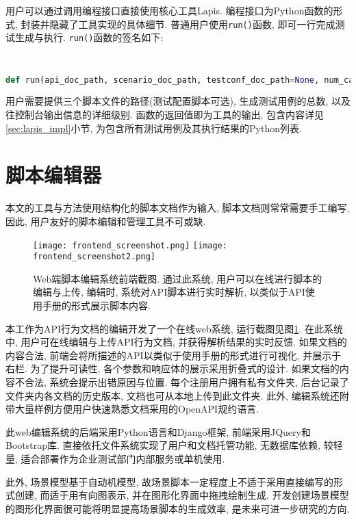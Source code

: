 	    \label{sec:program_interface}
        用户可以通过调用编程接口直接使用核心工具Lapis. 编程接口为Python函数的形式, 封装并隐藏了工具实现的具体细节. 普通用户使用\texttt{run()}函数, 即可一行完成测试生成与执行. \texttt{run()}函数的签名如下:
        \begin{flushleft}
            \scriptsize
            \tt
            \begin{lstlisting}[language=python]
def run(api_doc_path, scenario_doc_path, testconf_doc_path=None, num_case=1, verbose=0)
            \end{lstlisting}
        \end{flushleft}
        用户需要提供三个脚本文件的路径(测试配置脚本可选), 生成测试用例的总数, 以及往控制台输出信息的详细级别. 函数的返回值即为工具的输出, 包含内容详见\ref{sec:lapis_impl}小节, 为包含所有测试用例及其执行结果的Python列表.

	\section{脚本编辑器}

        本文的工具与方法使用结构化的脚本文档作为输入, 脚本文档则常常需要手工编写, 因此, 用户友好的脚本编辑和管理工具不可或缺.
        
        \begin{figure}[!htb]
            \centering
            \texttt{[image: frontend\_screenshot.png]}
            \texttt{[image: frontend\_screenshot2.png]}
            \caption{Web端脚本编辑系统前端截图. 通过此系统, 用户可以在线进行脚本的编辑与上传, 编辑时, 系统对API脚本进行实时解析, 以类似于API使用手册的形式展示脚本内容.}
            \label{fig:frontend_screenshot}
        \end{figure}
        
        本工作为API行为文档的编辑开发了一个在线web系统, 运行截图见图\ref{fig:frontend_screenshot}. 在此系统中, 用户可在线编辑与上传API行为文档, 并获得解析结果的实时反馈. 如果文档的内容合法, 前端会将所描述的API以类似于使用手册的形式进行可视化, 并展示于右栏. 为了提升可读性, 各个参数和响应体的展示采用折叠式的设计. 如果文档的内容不合法, 系统会提示出错原因与位置. 每个注册用户拥有私有文件夹, 后台记录了文件夹内各文档的历史版本, 文档也可从本地上传到此文件夹. 此外, 编辑系统还附带大量样例方便用户快速熟悉文档采用的OpenAPI规约语言.
        
        此web编辑系统的后端采用Python语言和Django框架, 前端采用JQuery和Bootstrap库. 直接依托文件系统实现了用户和文档托管功能, 无数据库依赖, 较轻量, 适合部署作为企业测试部门内部服务或单机使用.
    
        \label{sec:scenario_gui_edit}
        此外, 场景模型基于自动机模型, 故场景脚本一定程度上不适于采用直接编写的形式创建, 而适于用有向图表示, 并在图形化界面中拖拽绘制生成\cite{junyiw17}. 开发创建场景模型的图形化界面很可能将明显提高场景脚本的生成效率, 是未来可进一步研究的方向.
        


